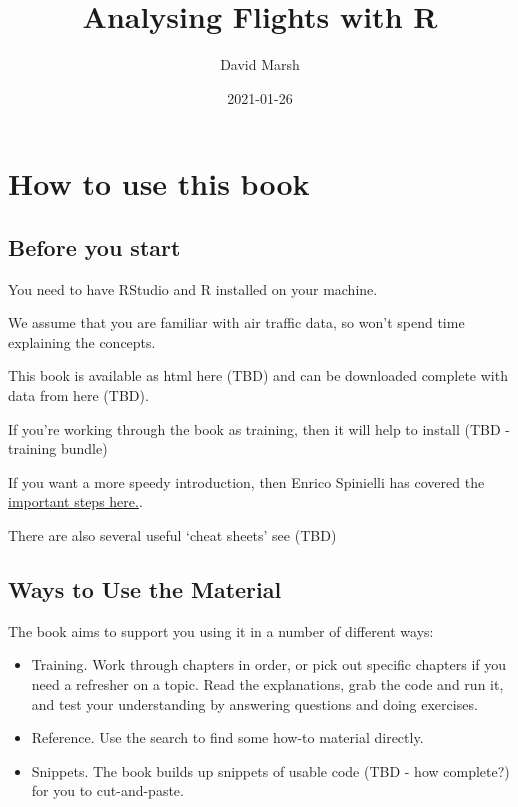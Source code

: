 \documentclass[
]{book}
\title{Analysing Flights with R}
\author{David Marsh}
\date{2021-01-26}
\begin{document}
\maketitle

{
\setcounter{tocdepth}{1}
\tableofcontents
}
\hypertarget{howto}{%
\chapter{How to use this book}\label{howto}}

\hypertarget{before-you-start}{%
\section{Before you start}\label{before-you-start}}

You need to have RStudio and R installed on your machine.

We assume that you are familiar with air traffic data, so won't spend time explaining the concepts.

This book is available as html here (TBD) and can be downloaded complete with data from here (TBD).

If you're working through the book as training, then it will help to install (TBD - training bundle)

If you want a more speedy introduction, then Enrico Spinielli has covered the \href{https://github.com/euctrl-pru/portal/wiki/Intro-to-everything}{important steps here.}.

There are also several useful `cheat sheets' see (TBD)

\hypertarget{ways-to-use-the-material}{%
\section{Ways to Use the Material}\label{ways-to-use-the-material}}

The book aims to support you using it in a number of different ways:

\begin{itemize}
\item
  Training. Work through chapters in order, or pick out specific chapters if you need a refresher on a topic. Read the explanations, grab the code and run it, and test your understanding by answering questions and doing exercises.
\item
  Reference. Use the search to find some how-to material directly.
\item
  Snippets. The book builds up snippets of usable code (TBD - how complete?) for you to cut-and-paste.
\end{itemize}
\end{document}
